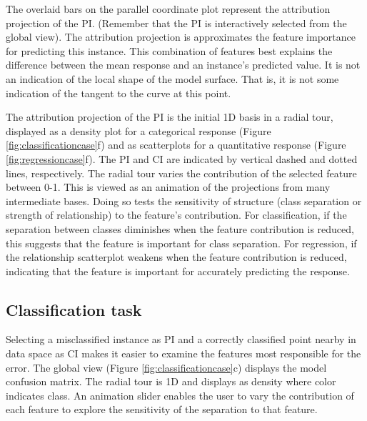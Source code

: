 \documentclass[
]{article}
\begin{document}
The overlaid bars on the parallel coordinate plot represent the attribution projection of the PI. (Remember that the PI is interactively selected from the global view). The attribution projection is approximates the feature importance for predicting this instance. This combination of features best explains the difference between the mean response and an instance's predicted value. It is not an indication of the local shape of the model surface. That is, it is not some indication of the tangent to the curve at this point.

The attribution projection of the PI is the initial 1D basis in a radial tour, displayed as a density plot for a categorical response (Figure \ref{fig:classificationcase}f) and as scatterplots for a quantitative response (Figure \ref{fig:regressioncase}f). The PI and CI are indicated by vertical dashed and dotted lines, respectively. The radial tour varies the contribution of the selected feature between 0-1. This is viewed as an animation of the projections from many intermediate bases. Doing so tests the sensitivity of structure (class separation or strength of relationship) to the feature's contribution. For classification, if the separation between classes diminishes when the feature contribution is reduced, this suggests that the feature is important for class separation. For regression, if the relationship scatterplot weakens when the feature contribution is reduced, indicating that the feature is important for accurately predicting the response.

\hypertarget{classification-task}{%
\subsection{Classification task}\label{classification-task}}

Selecting a misclassified instance as PI and a correctly classified point nearby in data space as CI makes it easier to examine the features most responsible for the error. The global view (Figure \ref{fig:classificationcase}c) displays the model confusion matrix. The radial tour is 1D and displays as density where color indicates class. An animation slider enables the user to vary the contribution of each feature to explore the sensitivity of the separation to that feature.
\end{document}
